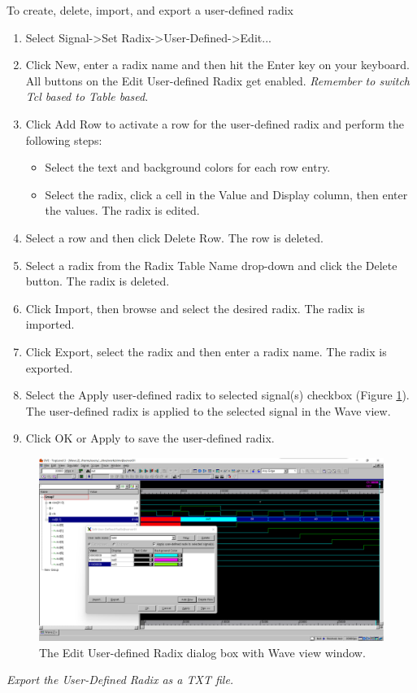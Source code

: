 \documentclass[a4paper,12pt,twoside]{article}
\begin{document}
To create, delete, import, and export a user-defined radix
\begin{enumerate}
    \item Select Signal->Set Radix->User-Defined->Edit...
    \item Click New, enter a radix name and then hit the Enter key on your keyboard. All buttons on the Edit User-defined Radix get enabled. \textit{Remember to switch Tcl based to Table based}.
    \item Click Add Row to activate a row for the user-defined radix and perform the following steps:
    \begin{itemize}
        \item Select the text and background colors for each row entry.
        \item Select the radix, click a cell in the Value and Display column, then enter the values. The radix is edited.
    \end{itemize}
    \item Select a row and then click Delete Row. The row is deleted.
    \item Select a radix from the Radix Table Name drop-down and click the Delete button. The radix is deleted.
    \item Click Import, then browse and select the desired radix. The radix is imported.
    \item Click Export, select the radix and then enter a radix name. The radix is exported.
    \item Select the Apply user-defined radix to selected signal(s) checkbox (Figure \ref{f32}). The user-defined radix is applied to the selected signal in the Wave view.
    \item Click OK or Apply to save the user-defined radix.
\end{enumerate}
\begin{figure}[H]
    \centering
    \includegraphics[width=\textwidth]{images/32.png}
    \caption{The Edit User-defined Radix dialog box with Wave view window.}
    \label{f32}
\end{figure}
\textit{Export the User-Defined Radix as a TXT file.}
\end{document}
